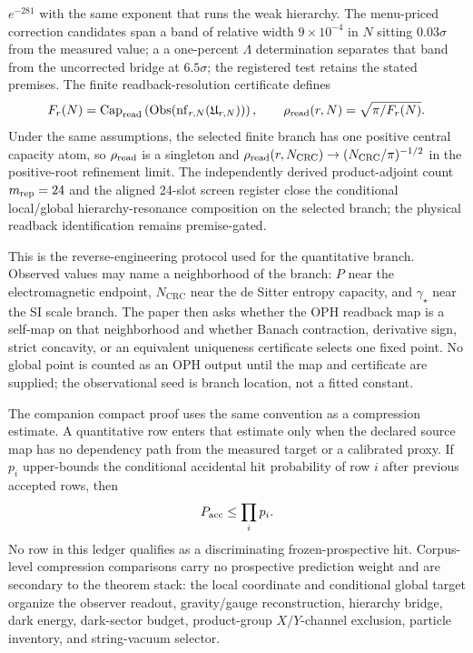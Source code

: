 \documentclass[11pt]{article}
\begin{document}
\(e^{-281}\) with the same exponent that runs the weak hierarchy. The
menu-priced correction candidates span a band of relative width
\(9\times10^{-4}\) in \(N\) sitting \(0.03\sigma\) from the measured value; a
a one-percent \(\Lambda\) determination separates that band
from the uncorrected bridge at \(6.5\sigma\); the registered test retains the
stated premises. The finite readback-resolution
certificate defines
\[
F_r(N)=\operatorname{Cap}_{\rm read}
\left(\operatorname{Obs}(\operatorname{nf}_{r,N}(\mathfrak U_{r,N}))\right),
\qquad
\rho_{\rm read}(r,N)=\sqrt{\pi/F_r(N)}.
\]
Under the same assumptions, the selected finite branch has one positive central
capacity atom, so \(\rho_{\rm read}\) is a singleton and
\(\rho_{\rm read}(r,N_{\rm CRC})\to(N_{\rm CRC}/\pi)^{-1/2}\) in the
positive-root refinement limit. The independently derived product-adjoint count
\(m_{\rm rep}=24\) and the aligned 24-slot screen register close the conditional
local/global hierarchy-resonance composition on the selected branch; the physical
readback identification remains premise-gated.

This is the reverse-engineering protocol used for the quantitative branch. Observed values may
name a neighborhood of the branch: \(P\) near the electromagnetic endpoint, \(N_{\mathrm{CRC}}\)
near the de Sitter entropy capacity, and \(\gamma_\star\) near the SI scale branch. The paper then
asks whether the OPH readback map is a self-map on that neighborhood and whether Banach
contraction, derivative sign, strict concavity, or an equivalent uniqueness certificate selects one
fixed point. No global point is counted as an OPH output until the map and certificate are supplied;
the observational seed is branch location, not a fitted constant.

The companion compact proof uses the same convention as a compression
estimate. A quantitative row enters that estimate only when the declared source
map has no dependency path from the measured target or a calibrated proxy. If
\(p_i\) upper-bounds the conditional accidental hit probability of row \(i\)
after previous accepted rows, then
\[
P_{\rm acc}\le\prod_i p_i .
\]
No row in this ledger qualifies as a discriminating frozen-prospective hit.
Corpus-level compression comparisons carry no prospective prediction weight and are secondary
to the theorem stack: the
local coordinate and conditional global target organize the observer readout,
gravity/gauge reconstruction, hierarchy bridge, dark energy, dark-sector
budget, product-group \(X/Y\)-channel exclusion, particle inventory, and
string-vacuum selector.
\end{document}
